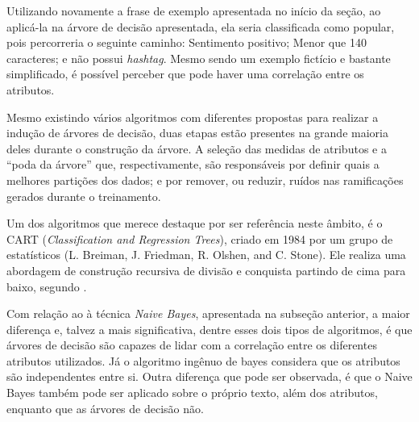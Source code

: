 \documentclass[oneside,openright,12pt]{ufsm_2015} %
\begin{document}
    \par Utilizando novamente a frase de exemplo apresentada no início da seção, ao aplicá-la na árvore de decisão apresentada, ela seria classificada como popular, pois percorreria o seguinte caminho: Sentimento positivo; Menor que 140 caracteres; e não possui \textit{hashtag}. Mesmo sendo um exemplo fictício e bastante simplificado, é possível perceber que pode haver uma correlação entre os atributos.
    
    \par Mesmo existindo vários algoritmos com diferentes propostas para realizar a indução de árvores de decisão, duas etapas estão presentes na grande maioria deles durante o construção da árvore. A seleção das medidas de atributos e a ``poda da árvore'' que, respectivamente, são responsáveis por definir quais a melhores partições dos dados; e por remover, ou reduzir, ruídos nas ramificações gerados durante o treinamento.
    
    \par Um dos algoritmos que merece destaque por ser referência neste âmbito, é o CART (\textit{Classification and Regression Trees}), criado em 1984 por um grupo de estatísticos (L. Breiman, J. Friedman, R. Olshen, and C. Stone). Ele realiza uma abordagem de construção recursiva de divisão e conquista partindo de cima para baixo, segundo \cite{book:han:11}.
    
    \par Com relação ao à técnica \textit{Naive Bayes}, apresentada na subseção anterior, a maior diferença e, talvez a mais significativa, dentre esses dois tipos de algoritmos, é que árvores de decisão são capazes de lidar com a correlação entre os diferentes atributos utilizados. Já o algoritmo ingênuo de bayes considera que os atributos são independentes entre si. Outra diferença que pode ser observada, é que o Naive Bayes também pode ser aplicado sobre o próprio texto, além dos atributos, enquanto que as árvores de decisão não.


\end{document}

